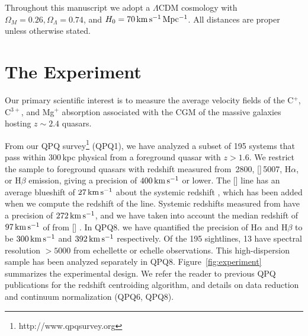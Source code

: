 \documentclass[iop]{emulateapj}
\begin{document}
Throughout this manuscript we adopt a $\Lambda$CDM cosmology with $\Omega_M=0.26, \Omega_\Lambda
=0.74$, and $H_0=70\,{\rm km\,s^{-1}\,Mpc^{-1}}$. All distances are proper unless otherwise 
stated. 

\section{The Experiment}
\label{sec:data}

Our primary scientific interest is to measure the average velocity fields of the C$^+$, C$^{3+}$, 
and Mg$^+$ absorption associated with the CGM of the massive galaxies hosting $z\sim 2.4$ quasars. 

From our QPQ survey\footnote{http://www.qpqsurvey.org} (QPQ1), we have analyzed a subset of 195 
systems that pass within 300\,kpc physical from a foreground quasar with $z > 1.6$. We restrict
 the sample to foreground quasars with redshift measured from \,2800, 
[]\,5007, H$\alpha$, or H$\beta$ emission, giving a precision of 
$400\,{\rm km\,s^{-1}}$ or lower. 
The [] line has an average blueshift of $27\,{\rm km\,s^{-1}}$ about the systemic 
redshift \citep{Boroson05}, which has been added when we compute the 
redshift of the line. Systemic redshifts measured from  have a precision of 
$272\,{\rm km\,s^{-1}}$, and we have taken into account the median redshift of 
$97\,{\rm km\,s^{-1}}$ of  from [] \citep{Richards+02}. In QPQ8. we have 
quantified the precision of H$\alpha$ and H$\beta$ to be 
$300\,{\rm km\,s^{-1}}$ and $392\,{\rm km\,s^{-1}}$ respectively. 
Of the 195 sightlines, 13 have spectral resolution $> 5000$ from echellette or echelle 
observations. This high-dispersion sample has been analyzed separately in QPQ8. 
Figure~\ref{fig:experiment} summarizes the experimental design. We refer the reader to previous 
QPQ publications for the redshift centroiding algorithm, and details on data reduction and 
continuum normalization (QPQ6, QPQ8). 
\end{document}
